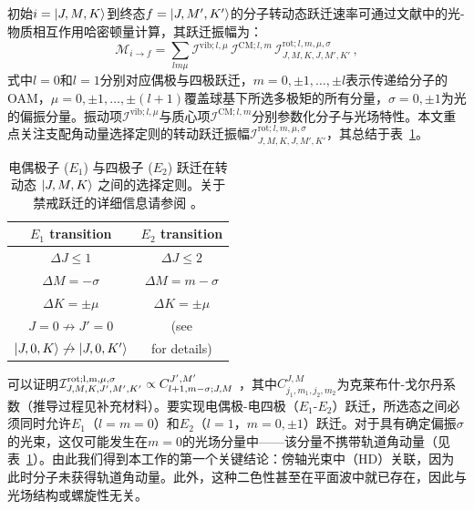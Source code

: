 \documentclass[reprint,aps,prl,twocolumn,superscriptaddress,groupedaddress]{revtex4-2}
\newcommand{\eoet}{$E_1$-$E_2$}
\begin{document}
初始$i=\ket{J,M,K}$到终态$f=\ket{J,M',K'}$的分子转动态跃迁速率可通过文献\cite{Maslov2024,Maslov_Thesis}中的光-物质相互作用哈密顿量计算，其跃迁振幅为：
\begin{equation}
    \mathcal{M}_{i\to f}=\sum_{lm\mu}\mathcal{I}^{\text{vib}; l,\mu}\,\mathcal{I}^{\text{CM}; l,m}\,\mathcal{I}^{\text{rot}; l,m,\mu,\sigma}_{J,M,K,J,M',K'}\,,
    \label{eq_transition_matrix}
\end{equation}
式中$l=0$和$l=1$分别对应偶极与四极跃迁，$m = 0, \pm 1, \dots, \pm l$表示传递给分子的OAM，$\mu = 0, \pm 1, \dots, \pm (l+1)$覆盖球基下所选多极矩的所有分量，$\sigma =0, \pm 1$为光的偏振分量。振动项$\mathcal{I}^{\text{vib}; l,\mu}$与质心项$\mathcal{I}^{\text{CM}; l,m}$分别参数化分子与光场特性。本文重点关注支配角动量选择定则的转动跃迁振幅$\mathcal{I}^{\text{rot};l,m,\mu,\sigma}_{J,M,K,J,M',K'}$，其总结于表~\ref{SelectionRules}。
\begin{table}[ht!]
    \centering
    \begin{tabular}{c c}\hline
    \toprule
        \textbf{$E_1$ transition} & \textbf{$E_2$ transition}  \\
        \midrule
        $\Delta J\leq 1$ &  $\Delta J\leq 2$ \\
        $\Delta M=-\sigma$ & $\Delta M=m-\sigma$ \\
        $\Delta K=\pm\mu$ & $\Delta K=\pm\mu$ \\
        $J=0\not\to J'=0$ &  (see \cite{Note1}\\
        $\ket{J,0,K}\not\to\ket{J,0,K'}$ &  for details)\\
    \bottomrule
\hline
    \end{tabular}
    \caption{电偶极子 ($E_1$) 与四极子 ($E_2$) 跃迁在转动态 $\ket{J,M,K}$ 之间的选择定则。关于禁戒跃迁的详细信息请参阅 \cite{Note1}。}
    \label{SelectionRules}
\end{table}
可以证明$\mathcal{I}^{\rm rot; l, m, \mu, \sigma}_{J, M, K, J', M', K'} \propto C^{J',M'}_{l+1, m-\sigma; J, M}$ \cite{Maslov2024,Maslov_Thesis}，其中$C^{J, M}_{j_1, m_1, j_2, m_2}$为克莱布什-戈尔丹系数（推导过程见补充材料\cite{Note1}）。要实现电偶极-电四极（\eoet）跃迁，所选态之间必须同时允许$E_1$（$l=m=0$）和$E_2$（$l=1$，$m=0, \pm 1$）跃迁。对于具有确定偏振$\sigma$的光束，这仅可能发生在$m=0$的光场分量中——该分量不携带轨道角动量（见表~\ref{SelectionRules}）。由此我们得到本工作的第一个关键结论：傍轴光束中（HD）关联，因为此时分子未获得轨道角动量。此外，这种二色性甚至在平面波中就已存在，因此与光场结构或螺旋性无关。
\end{document}
